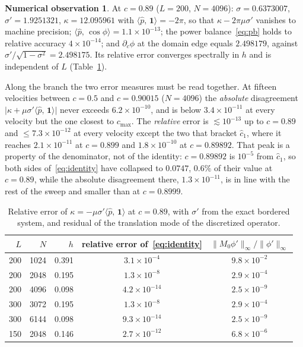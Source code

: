 \documentclass[11pt]{article}
\theoremstyle{plain}
\theoremstyle{definition}
\newtheorem{observation}[theorem]{Numerical observation}
\theoremstyle{remark}
\newcommand{\ip}[2]{\langle #1,\,#2\rangle}
\newcommand{\ph}{\hat p}
\newcommand{\one}{\mathbf 1}
\newcommand{\chat}{\hat c_1}
\newcommand{\cmax}{c_{\max}}
\begin{document}
\begin{observation}\label{obs:identity}
At $c=0.89$ ($L=200$, $N=4096$): $\sigma=0.6373007$, $\sigma'=1.9251321$,
$\kappa=12.095961$ with $\ip{\ph}{\one}=-2\pi$, so that
$\kappa-2\pi\mu\sigma'$ vanishes to machine precision; $\ip{\ph}{\cos\phi}=1.1\times10^{-13}$;
the power balance~\eqref{eq:pb} holds to relative accuracy $4\times10^{-14}$; and
$\partial_c\phi$ at the domain edge equals $2.498179$, against
$\sigma'/\sqrt{1-\sigma^2}=2.498175$. Its relative error converges spectrally in $h$ and is
independent of $L$ (Table~\ref{tab:conv}).

Along the branch the two error measures must be read together. At fifteen velocities
between $c=0.5$ and $c=0.90015$ ($N=4096$) the \emph{absolute} disagreement
$\bigl|\kappa+\mu\sigma'\ip{\ph}{\one}\bigr|$ never exceeds $6.2\times10^{-10}$, and is below
$3.4\times10^{-11}$ at every velocity but the one closest to $\cmax$. The \emph{relative}
error is $\lesssim10^{-13}$ up to $c=0.89$ and $\leq7.3\times10^{-12}$ at every velocity
except the two that bracket $\chat$, where it reaches $2.1\times10^{-11}$ at $c=0.899$ and
$1.8\times10^{-10}$ at $c=0.89892$. That peak is a property of the denominator, not of the
identity: $c=0.89892$ is $10^{-5}$ from $\chat$, so both sides of~\eqref{eq:identity} have
collapsed to $0.0747$, $0.6\%$ of their value at $c=0.89$, while the absolute disagreement
there, $1.3\times10^{-11}$, is in line with the rest of the sweep and smaller than at
$c=0.8999$.
\end{observation}

\begin{table}[h]
\centering\small
\caption{Relative error of $\kappa=-\mu\sigma'\ip{\ph}{\one}$ at $c=0.89$, with $\sigma'$
from the exact bordered system, and residual of the translation mode of the discretized
operator.}
\label{tab:conv}
\begin{tabular}{@{}rrrcc@{}}
\toprule
$L$ & $N$ & $h$ & relative error of~\eqref{eq:identity} & $\|M_0\phi'\|_\infty/\|\phi'\|_\infty$\\
\midrule
200 & 1024 & 0.391 & $3.1\times10^{-4}$ & $9.8\times10^{-2}$\\
200 & 2048 & 0.195 & $1.3\times10^{-8}$ & $2.9\times10^{-4}$\\
200 & 4096 & 0.098 & $4.2\times10^{-14}$ & $2.5\times10^{-9}$\\
300 & 3072 & 0.195 & $1.3\times10^{-8}$ & $2.9\times10^{-4}$\\
300 & 6144 & 0.098 & $9.3\times10^{-14}$ & $2.5\times10^{-9}$\\
150 & 2048 & 0.146 & $2.7\times10^{-12}$ & $6.8\times10^{-6}$\\
\bottomrule
\end{tabular}
\end{table}
\end{document}
